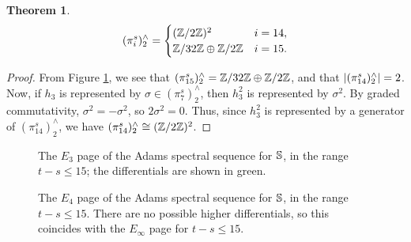 \documentclass[11pt, titlepage]{article} %
\def\bb{\ensuremath\mathbb}
\def\subq{\ensuremath\subseteq}
\def\inte{\ensuremath\mathbb{Z}}
\DeclareMathOperator{\im}{im}
\numberwithin{equation}{subsection}
\theoremstyle{plain}
\newtheorem{theorem}{Theorem}[subsection]
\theoremstyle{definition}
\begin{document}
\begin{theorem}
\[(\pi_i^s)^\wedge_2=\begin{cases}
(\inte/2\inte)^2 & i = 14,\\
\inte/32\inte \oplus \inte/2\inte & i = 15.
\end{cases}\]
\end{theorem}

\begin{proof}
From Figure \ref{2505051617}, we see that \((\pi_{15}^s)^\wedge_2=\inte/32\inte\oplus\inte/2\inte\), and that \(\lvert(\pi_{14}^s)^\wedge_2\rvert=2\). Now, if \(h_3\) is represented by \(\sigma\in (\pi_7^s)^\wedge_2\), then \(h_3^2\) is represented by \(\sigma^2\). By graded commutativity, \(\sigma^2=-\sigma^2\), so \(2\sigma^2=0\). Thus, since \(h_3^2\) is represented by a generator of \((\pi_{14}^s)^\wedge_2\), we have \((\pi_{14}^s)^\wedge_2\cong (\inte/2\inte)^2\). 
\end{proof}
\begin{figure}[H]
\centering

\caption{The \(E_3\) page of the Adams spectral sequence for \(\bb{S}\), in the range \(t-s\leq 15\); the differentials are shown in green.}
\end{figure}
\begin{figure}[H]
\centering

\caption{The \(E_4\) page of the Adams spectral sequence for \(\bb{S}\), in the range \(t-s\leq 15\). There are no possible higher differentials, so this coincides with the \(E_\infty\) page for \(t-s\leq 15\).}
\label{2505051617}
\end{figure}

\vfill \eject

%                                                                             
%                                                                             
\end{document}
